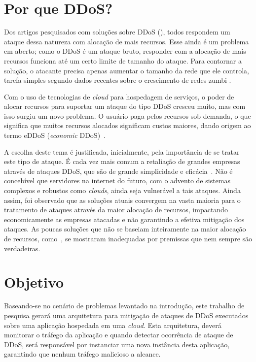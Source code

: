 \documentclass[a4paper, 11pt]{article}
\begin{document}
\section{Por que DDoS?}
Dos artigos pesquisados com soluções sobre DDoS (\cite{Zhang:11, Zuckerman:10, Soon:10}), todos respondem um ataque dessa natureza com alocação de mais recursos. Esse ainda é um problema em aberto; como o DDoS é um ataque bruto, responder com a alocação de mais recursos funciona até um certo limite de tamanho do ataque. Para contornar a solução, o atacante precisa apenas aumentar o tamanho da rede que ele controla, tarefa simples segundo dados recentes sobre o crescimento de redes zumbi \cite{Chao:09}.

Com o uso de tecnologias de \emph{cloud} para hospedagem de serviços, o poder de alocar recursos para suportar um ataque do tipo DDoS cresceu muito, mas com isso surgiu um novo problema. O usuário paga pelos recursos sob demanda, o que significa que muitos recursos alocados significam custos maiores, dando origem ao termo eDDoS (\emph{economic} DDoS)~\cite{Soon:10}.

A escolha deste tema é justificada, inicialmente, pela importância de se tratar este tipo de ataque. É cada vez mais comum a retaliação de grandes empresas através de ataques DDoS, que são de grande simplicidade e eficácia~\cite{ddosatks}. Não é concebível que servidores na internet do futuro, com o advento de sistemas complexos e robustos como \emph{clouds}, ainda seja vulnerável a tais ataques. Ainda assim, foi observado que as soluções atuais convergem na vasta maioria para o tratamento de ataques através da maior alocação de recursos, impactando economicamente as empresas atacadas e não garantindo a efetiva mitigação dos ataques. As poucas soluções que não se baseiam inteiramente na maior alocação de recursos, como~\cite{Soon:10}, se mostraram inadequadas por premissas que nem sempre são verdadeiras.

\section{Objetivo}
Baseando-se no cen\'ario de problemas levantado na introdu\c{c}\~{a}o, este
trabalho de pesquisa gerar\'a uma arquitetura para mitigação de ataques de
DDoS executados sobre uma aplicação hospedada em uma \emph{cloud}. Esta
arquitetura, dever\'a monitorar o tr\'afego da aplica\c{c}\~{a}o e quando
detectar
ocorrência de ataque de DDoS, ser\'a respons\'avel por instanciar uma nova
instância desta
aplica\c{c}\~{a}o, garantindo que nenhum tr\'afego malicioso a alcance.
\end{document}
